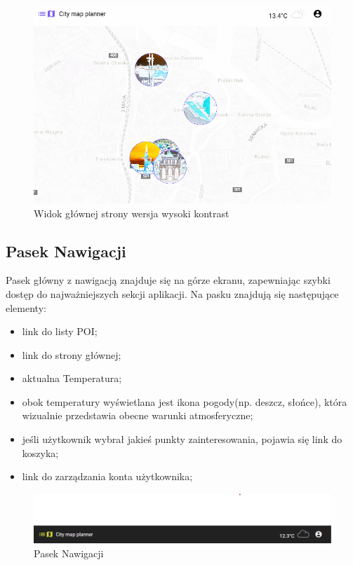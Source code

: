         \begin{figure}[H]
            \centering
            \includegraphics[width=1\textwidth]{attachments/mapawidok-high-contrast}
            \caption{Widok głównej strony wersja wysoki kontrast}
            \label{fig:mapawidok}
            \end{figure}

\subsection{Pasek Nawigacji}
\label{sec:pasek-nawigacji}
Pasek główny z nawigacją znajduje się na górze ekranu, zapewniając szybki dostęp do najważniejszych sekcji aplikacji. Na pasku znajdują się następujące elementy:
\begin{itemize}
    \item link do listy POI;
    \item link do strony głównej;
    \item aktualna Temperatura;
    \item obok temperatury wyświetlana jest ikona pogody(np. deszcz, słońce), która wizualnie przedstawia obecne warunki atmosferyczne;
    \item jeśli użytkownik wybrał jakieś punkty zainteresowania, pojawia się link do koszyka;
    \item link do zarządzania konta użytkownika;
\end{itemize}
\begin{figure}[H]
    \centering
    \includegraphics[width=1\textwidth]{attachments/nav-baner}
    \caption{Pasek Nawigacji}
    \label{fig:pasek-nawigacji}
\end{figure}

